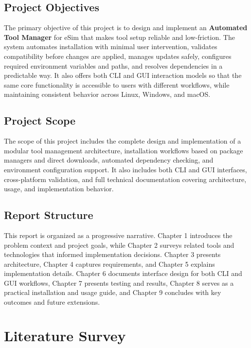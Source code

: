 \documentclass[12pt,a4paper]{report}
\begin{document}
\section{Project Objectives}
The primary objective of this project is to design and implement an \textbf{Automated Tool Manager} for eSim that makes tool setup reliable and low-friction. The system automates installation with minimal user intervention, validates compatibility before changes are applied, manages updates safely, configures required environment variables and paths, and resolves dependencies in a predictable way. It also offers both CLI and GUI interaction models so that the same core functionality is accessible to users with different workflows, while maintaining consistent behavior across Linux, Windows, and macOS.

\section{Project Scope}
The scope of this project includes the complete design and implementation of a modular tool management architecture, installation workflows based on package managers and direct downloads, automated dependency checking, and environment configuration support. It also includes both CLI and GUI interfaces, cross-platform validation, and full technical documentation covering architecture, usage, and implementation behavior.

\section{Report Structure}
This report is organized as a progressive narrative. Chapter 1 introduces the problem context and project goals, while Chapter 2 surveys related tools and technologies that informed implementation decisions. Chapter 3 presents architecture, Chapter 4 captures requirements, and Chapter 5 explains implementation details. Chapter 6 documents interface design for both CLI and GUI workflows, Chapter 7 presents testing and results, Chapter 8 serves as a practical installation and usage guide, and Chapter 9 concludes with key outcomes and future extensions.

\chapter{Literature Survey}
\end{document}
